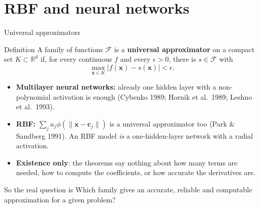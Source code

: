 \documentclass[10pt,aspectratio=169]{beamer}
\newcommand{\hl}[1]{\textcolor{accent}{\textbf{#1}}}
\newcommand{\R}{\mathbb{R}}
\newcommand{\x}{\bm{x}}
\newcommand{\cc}{\bm{c}}
\begin{document}
\section{RBF and neural networks}

\begin{frame}{Universal approximators}
  \begin{block}{Definition}
    A family of functions $\mathcal{F}$ is a \textbf{universal approximator}
    on a compact set $K\subset\R^d$ if, for every continuous $f$ and every
    $\epsilon>0$, there is $s\in\mathcal{F}$ with
    \[
      \max_{\x\in K} |f(\x) - s(\x)| < \epsilon .
    \]
  \end{block}
  \begin{itemize}
    \item \textbf{Multilayer neural networks:} already one hidden layer with a
          non-polynomial activation is enough (Cybenko 1989; Hornik et al.\
          1989; Leshno et al.\ 1993).
    \item \textbf{RBF:} $\sum_j a_j\phi(\lVert\x-\cc_j\rVert)$ is a universal
          approximator too (Park \& Sandberg 1991). An RBF model \emph{is} a
          one-hidden-layer network with a radial activation.
    \item \hl{Existence only}: the theorems say nothing about how many terms
          are needed, how to compute the coefficients, or how accurate the
          derivatives are.
  \end{itemize}
  \vspace{0.3em}
  \begin{alertblock}{So the real question is}
    Which family gives an accurate, reliable and computable approximation
    for a given problem?
  \end{alertblock}
\end{frame}
\end{document}
